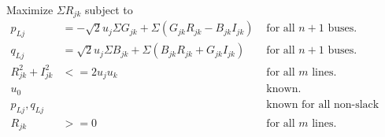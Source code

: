 \documentclass{article}
\begin{document}
\large{Maximize $\Sigma R_{jk}$ subject to}
\normalsize
\begin{align}
	p_{Lj} &= -\sqrt{2}u_j\Sigma G_{jk} + \Sigma (G_{jk}R_{jk} - B_{jk}I_{jk}) & \text{ for all $n+1$ buses.} \nonumber\\
	q_{Lj} &= \sqrt{2}u_j\Sigma B_{jk} + \Sigma (B_{jk}R_{jk} + G_{jk}I_{jk}) & \text{ for all $n+1$ buses.} \nonumber\\
	R_{jk}^2 + I_{jk}^2 &<= 2u_ju_k & \text{ for all $m$ lines.} \nonumber\\
	u_0 &{} & \text{ known.} \nonumber\\
	p_{Lj}, q_{Lj} &{} & \text{ known for all non-slack buses.} \nonumber\\
	R_{jk} &>= 0 & \text{ for all $m$ lines.} \nonumber
\end{align}
\end{document}
